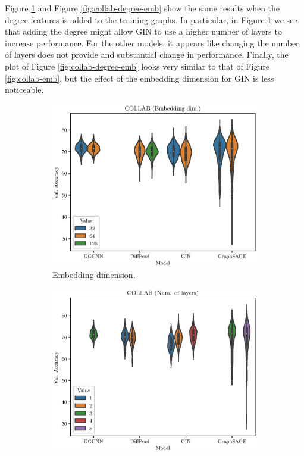 Figure \ref{fig:collab-degree-layer} and Figure \ref{fig:collab-degree-emb} show the same results when the degree features is added to the training graphs. In particular, in Figure \ref{fig:collab-degree-layer} we see that adding the degree might allow GIN to use a higher number of layers to increase performance. For the other models, it appears like changing the number of layers does not provide and substantial change in performance.
Finally, the plot  of Figure \ref{fig:collab-degree-emb} looks very similar to that of Figure \ref{fig:collab-emb}, but the effect of the embedding dimension for GIN is less noticeable.

\begin{figure}[h!]
    \centering
    \begin{subfigure}[b]{0.49\textwidth}
        \centering
        \includegraphics[width=\textwidth]{Figures/Chapter4/collab-degree-embedding.eps}
        \caption{Embedding dimension.}
        \label{fig:collab-degree-layer}
    \end{subfigure}
    \hfill
    \begin{subfigure}[b]{0.49\textwidth}
        \centering
        \includegraphics[width=\textwidth]{Figures/Chapter4/collab-degree-layers.eps}

\end{subfigure}
\end{figure}
